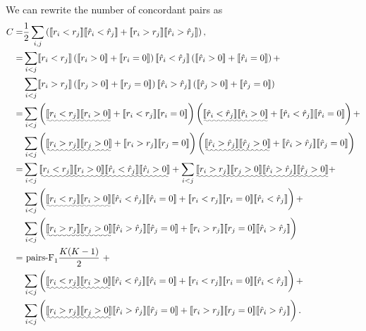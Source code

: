 We can rewrite the number of concordant pairs as
\begin{align*}
C =& \frac{1}{2} \sum_{i,j} \left(\llb r_i < r_j \rrb  \llb \hat{r}_i < \hat{r}_j \rrb +
     \llb r_i > r_j \rrb  \llb \hat{r}_i > \hat{r}_j \rrb \right), \\
  =& \sum_{i < j} \llb r_i < r_j \rrb  
     \left( \llb r_i > 0 \rrb + \llb r_i = 0 \rrb \right)  
     \llb \hat{r}_i < \hat{r}_j \rrb 
     \left( \llb \hat{r}_i > 0 \rrb + \llb \hat{r}_i = 0 \rrb \right) + \\
   & \sum_{i < j} \llb r_i > r_j \rrb  
     \left( \llb r_j > 0 \rrb + \llb r_j = 0 \rrb \right) 
     \llb \hat{r}_i > \hat{r}_j \rrb 
     \left( \llb \hat{r}_j > 0 \rrb + \llb \hat{r}_j = 0 \rrb \right) \\
  =& \sum_{i < j} \left( \uwave{\llb r_i < r_j \rrb  \llb r_i > 0 \rrb} +
            \llb r_i < r_j \rrb  \llb r_i = 0 \rrb \right)  
     \left( \uwave{\llb \hat{r}_i < \hat{r}_j \rrb  \llb \hat{r}_i > 0 \rrb} + 
            \llb \hat{r}_i < \hat{r}_j \rrb  \llb \hat{r}_i = 0 \rrb \right) + \\
   & \sum_{i < j} \left( \uwave{\llb r_i > r_j \rrb  \llb r_j > 0 \rrb} + 
            \llb r_i > r_j \rrb  \llb r_j = 0 \rrb \right) 
     \left( \uwave{\llb \hat{r}_i > \hat{r}_j \rrb  \llb \hat{r}_j > 0 \rrb} + 
            \llb \hat{r}_i > \hat{r}_j \rrb  \llb \hat{r}_j = 0 \rrb \right) \\
  =& \sum_{i < j} \uwave{\llb r_i < r_j \rrb  \llb r_i > 0 \rrb 
                         \llb \hat{r}_i < \hat{r}_j \rrb  \llb \hat{r}_i > 0 \rrb} +
     \sum_{i < j} \uwave{\llb r_i > r_j \rrb  \llb r_j > 0 \rrb 
                         \llb \hat{r}_i > \hat{r}_j \rrb  \llb \hat{r}_j > 0 \rrb} + \\
   & \sum_{i < j} \left( \uwave{\llb r_i < r_j \rrb  \llb r_i > 0 \rrb} 
                         \llb \hat{r}_i < \hat{r}_j \rrb  \llb \hat{r}_i = 0 \rrb + 
                         \llb r_i < r_j \rrb  \llb r_i = 0 \rrb  
                         \llb \hat{r}_i < \hat{r}_j \rrb \right) + \\ 
   & \sum_{i < j} \left( \uwave{\llb r_i > r_j \rrb  \llb r_j > 0 \rrb} 
                         \llb \hat{r}_i > \hat{r}_j \rrb  \llb \hat{r}_j = 0 \rrb +
                         \llb r_i > r_j \rrb  \llb r_j = 0 \rrb 
                         \llb \hat{r}_i > \hat{r}_j \rrb \right) \\
  =& ~\text{pairs-F}_1  \frac{K(K-1)}{2}~ + \\
   & \sum_{i < j} \left( \uwave{\llb r_i < r_j \rrb  \llb r_i > 0 \rrb} 
                         \llb \hat{r}_i < \hat{r}_j \rrb  \llb \hat{r}_i = 0 \rrb + 
                         \llb r_i < r_j \rrb  \llb r_i = 0 \rrb  
                         \llb \hat{r}_i < \hat{r}_j \rrb \right) + \\ 
   & \sum_{i < j} \left( \uwave{\llb r_i > r_j \rrb  \llb r_j > 0 \rrb} 
                         \llb \hat{r}_i > \hat{r}_j \rrb  \llb \hat{r}_j = 0 \rrb +
                         \llb r_i > r_j \rrb  \llb r_j = 0 \rrb 
                         \llb \hat{r}_i > \hat{r}_j \rrb \right).
\end{align*}
